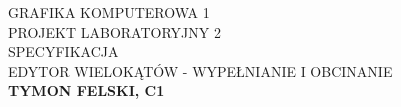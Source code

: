 \documentclass[12pt]{article}
\begin{document}
\begin{titlepage}

  \fancyhead{}
  \fancyfoot{}


  \begin{center}
    \huge{GRAFIKA KOMPUTEROWA 1}\\
    \huge{PROJEKT LABORATORYJNY 2}\\
    \Large{SPECYFIKACJA}\\
    \Large{EDYTOR WIELOKĄTÓW - WYPEŁNIANIE I OBCINANIE}\\
    \large\textbf{TYMON FELSKI, C1}\\
  \end{center}

\end{titlepage}
\end{document}
